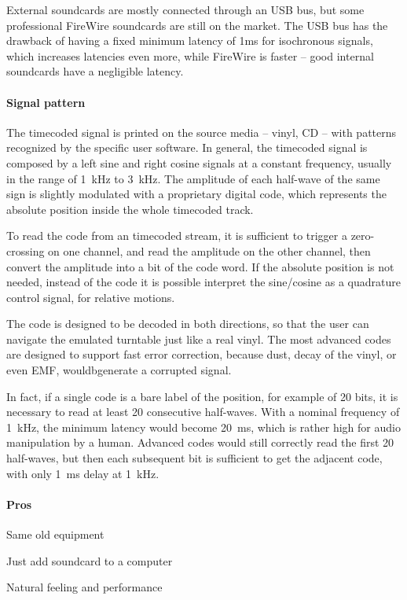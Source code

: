 \documentclass[a4paper,10pt]{article}
\begin{document}
\begin{multicols}{2}
External soundcards are mostly connected through an USB bus, but some
professional FireWire soundcards are still on the market. The USB bus has the
drawback of having a fixed minimum latency of 1ms for isochronous signals,
which increases latencies even more, while FireWire is faster -- good internal
soundcards have a negligible latency.


\paragraph{Signal pattern}
The timecoded signal is printed on the source media -- vinyl, CD -- with
patterns recognized by the specific user software. In general, the timecoded
signal is composed by a left sine and right cosine signals at a constant
frequency, usually in the range of 1~kHz to 3~kHz. The amplitude of each
half-wave of the same sign is slightly modulated with a proprietary digital
code, which represents the absolute position inside the whole timecoded track.

To read the code from an timecoded stream, it is sufficient to trigger a
zero-crossing on one channel, and read the amplitude on the other channel,
then convert the amplitude into a bit of the code word. If the absolute
position is not needed, instead of the code it is possible interpret the
sine/cosine as a quadrature control signal, for relative motions.

The code is designed to be decoded in both directions, so that the user can
navigate the emulated turntable just like a real vinyl. The most advanced
codes are designed to support fast error correction, because dust, decay of
the vinyl, or even EMF, wouldbgenerate a corrupted signal.

In fact, if a single code is a bare label of the position, for example of 20
bits, it is necessary to read at least 20 consecutive half-waves. With a
nominal frequency of 1~kHz, the minimum latency would become 20~ms, which is
rather high for audio manipulation by a human. Advanced codes would still
correctly read the first 20 half-waves, but then each subsequent bit is
sufficient to get the adjacent code, with only 1~ms delay at 1~kHz.


\paragraph{Pros}
\begin{itemize*}
	\item Same old equipment
	\item Just add soundcard to a computer
	\item Natural feeling and performance
\end{itemize*}



\end{multicols}
\end{document}
